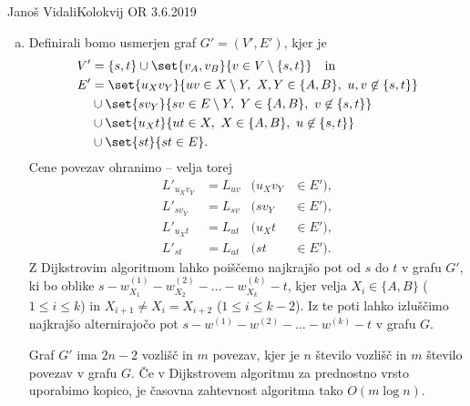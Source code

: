 \begin{naloga}{Janoš Vidali}{Kolokvij OR 3.6.2019}
\begin{odgovor}
\begin{enumerate}[(a)]
\item Definirali bomo usmerjen graf $G' = (V', E')$,
kjer je
\begin{align*}
V' &= \{s, t\} \cup \set{v_A, v_B}{v \in V \setminus \{s, t\}}
\quad \text{in} \\
E' &= \set{u_X v_Y}{uv \in X \setminus Y, \ X, Y \in \{A, B\}, \ u, v \not\in \{s, t\}} \\
   &\cup \set{s v_Y}{sv \in E \setminus Y, \ Y \in \{A, B\}, \ v \not\in \{s, t\}} \\
   &\cup \set{u_X t}{ut \in X, \ X \in \{A, B\}, \ u \not\in \{s, t\}} \\
   &\cup \set{st}{st \in E} .
\end{align*}
Cene povezav ohranimo -- velja torej
\begin{align*}
L'_{u_X v_Y} &= L_{uv} & (u_X v_Y &\in E'), \\
L'_{s v_Y} &= L_{sv} & (s v_Y &\in E'), \\
L'_{u_X t} &= L_{ut} & (u_X t &\in E'), \\
L'_{st} &= L_{ut} & (s t &\in E').
\end{align*}
Z Dijkstrovim algoritmom lahko
poiščemo najkrajšo pot od $s$ do $t$ v grafu $G'$,
ki bo oblike $s - w^{(1)}_{X_1} - w^{(2)}_{X_2} - \dots - w^{(k)}_{X_k} - t$,
kjer velja $X_i \in \{A, B\}$ ($1 \le i \le k$)
in $X_{i+1} \ne X_i = X_{i+2}$ ($1 \le i \le k-2$).
Iz te poti lahko izluščimo najkrajšo alternirajočo pot
$s - w^{(1)} - w^{(2)} - \dots - w^{(k)} - t$ v grafu $G$.

Graf $G'$ ima $2n-2$ vozlišč in $m$ povezav,
kjer je $n$ število vozlišč in $m$ število povezav v grafu $G$.
Če v Dijkstrovem algoritmu za prednostno vrsto uporabimo kopico,
je časovna zahtevnost algoritma tako $O(m \log n)$.


\end{enumerate}
\end{odgovor}
\end{naloga}
